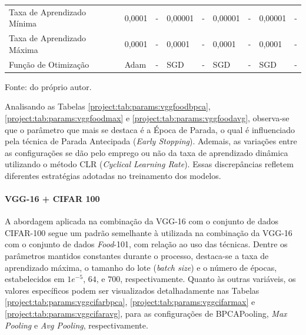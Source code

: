 \begin{table}[H]
{\begin{tabular}{l|l|l|l|l|l|l|l|l}
        Taxa de Aprendizado Mínima                   & 0,0001                             & -                       & 0,00001                            & -                       & 0,00001                            & -                       & 0,00001                            & -                                                                  \\
        Taxa de Aprendizado Máxima                   & 0,0001                             & -                       & 0,0001                             & -                       & 0,0001                             & -                       & 0,0001                             & -                                                                  \\
        Função de Otimização                         & Adam                               & -                       & SGD                                & -                       & SGD                                & -                       & SGD                                & -                       
    \end{tabular}
    }

\vspace*{1 cm}
Fonte: do próprio autor.
\end{table}

Analisando as Tabelas \ref{project:tab:params:vggfoodbpca}, \ref{project:tab:params:vggfoodmax} e \ref{project:tab:params:vggfoodavg}, observa-se que o parâmetro que mais se destaca é a Época de Parada, o qual é influenciado pela técnica de Parada Antecipada (\textit{Early Stopping}). Ademais, as variações entre as configurações se dão pelo emprego ou não da taxa de aprendizado dinâmica utilizando o método CLR (\textit{Cyclical Learning Rate}). Essas discrepâncias refletem diferentes estratégias adotadas no treinamento dos modelos.

\paragraph{VGG-16 + CIFAR 100}
\label{params:vggcifar}
A abordagem aplicada na combinação da VGG-16 com o conjunto de dados CIFAR-100 segue um padrão semelhante à utilizada na combinação da VGG-16 com o conjunto de dados \textit{Food}-101, com relação ao uso das técnicas. Dentre os parâmetros mantidos constantes durante o processo, destaca-se a taxa de aprendizado máxima, o tamanho do lote (\textit{batch size}) e o número de épocas, estabelecidos em $1e^{-5}$, $64$, e $700$, respectivamente. Quanto às outras variáveis, os valores específicos podem ser visualizados detalhadamente nas Tabelas \ref{project:tab:params:vggcifarbpca}, \ref{project:tab:params:vggcifarmax} e \ref{project:tab:params:vggcifaravg}, para as configurações de BPCAPooling, \textit{Max Pooling} e \textit{Avg Pooling}, respectivamente.


